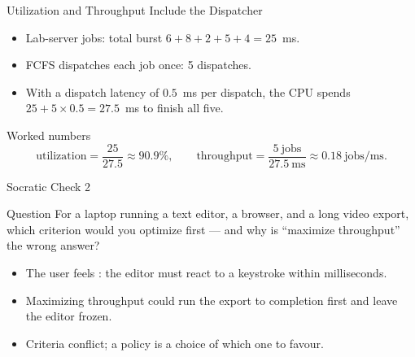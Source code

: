 \documentclass[aspectratio=169]{beamer}
\begin{document}
\begin{frame}{Utilization and Throughput Include the Dispatcher}
  \begin{itemize}
    \item Lab-server jobs: total burst $6+8+2+5+4 = 25$~ms.
    \item FCFS dispatches each job once: 5 dispatches.
    \item With a dispatch latency of $0.5$~ms per dispatch, the CPU spends
      $25 + 5 \times 0.5 = 27.5$~ms to finish all five.
  \end{itemize}
  \vspace{0.15cm}
  \begin{exampleblock}{Worked numbers}
    \[
      \text{utilization} = \frac{25}{27.5} \approx 90.9\%, \qquad
      \text{throughput} = \frac{5\ \text{jobs}}{27.5\ \text{ms}} \approx 0.18\ \text{jobs/ms}.
    \]
  \end{exampleblock}
\end{frame}

\begin{frame}{Socratic Check 2}
  \begin{block}{Question}
    For a laptop running a text editor, a browser, and a long video export,
    which criterion would you optimize first --- and why is ``maximize
    throughput'' the wrong answer?
  \end{block}
  \vspace{0.25cm}
  \begin{itemize}
    \item The user feels : the editor must react to a
      keystroke within milliseconds.
    \item Maximizing throughput could run the export to completion first and
      leave the editor frozen.
    \item Criteria conflict; a policy is a choice of which one to favour.
  \end{itemize}
\end{frame}


\end{document}
